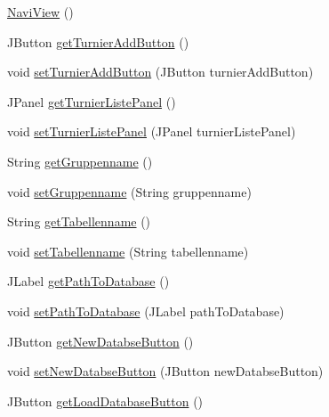 \begin{DoxyCompactItemize}
\item 
\hyperlink{classde_1_1turnierverwaltung_1_1view_1_1_navi_view_a902b43fc61b919187442721a3181e7db}{Navi\+View} ()
\item 
J\+Button \hyperlink{classde_1_1turnierverwaltung_1_1view_1_1_navi_view_abf008fc153ca383fc708f357a07c957f}{get\+Turnier\+Add\+Button} ()
\item 
void \hyperlink{classde_1_1turnierverwaltung_1_1view_1_1_navi_view_a4f66109881102f8f7e7462a22748b2dc}{set\+Turnier\+Add\+Button} (J\+Button turnier\+Add\+Button)
\item 
J\+Panel \hyperlink{classde_1_1turnierverwaltung_1_1view_1_1_navi_view_ab43468c56143bb27b23de9bd4a181d65}{get\+Turnier\+Liste\+Panel} ()
\item 
void \hyperlink{classde_1_1turnierverwaltung_1_1view_1_1_navi_view_abde5fadb23356880cd3871064dd0e0bd}{set\+Turnier\+Liste\+Panel} (J\+Panel turnier\+Liste\+Panel)
\item 
String \hyperlink{classde_1_1turnierverwaltung_1_1view_1_1_navi_view_a3099afb7425f03b2fa5626b797021e52}{get\+Gruppenname} ()
\item 
void \hyperlink{classde_1_1turnierverwaltung_1_1view_1_1_navi_view_a1de9bbbad0261bc5866bb77019b976a0}{set\+Gruppenname} (String gruppenname)
\item 
String \hyperlink{classde_1_1turnierverwaltung_1_1view_1_1_navi_view_a69a94b7e09d9956c76cb4480178d3c54}{get\+Tabellenname} ()
\item 
void \hyperlink{classde_1_1turnierverwaltung_1_1view_1_1_navi_view_aeee8397b8ec767f41829d710ace1948e}{set\+Tabellenname} (String tabellenname)
\item 
J\+Label \hyperlink{classde_1_1turnierverwaltung_1_1view_1_1_navi_view_a026e4dcf187cbf61e496e541ed1fae7b}{get\+Path\+To\+Database} ()
\item 
void \hyperlink{classde_1_1turnierverwaltung_1_1view_1_1_navi_view_a9ca0f7384d78651f19598af6a4ae08ff}{set\+Path\+To\+Database} (J\+Label path\+To\+Database)
\item 
J\+Button \hyperlink{classde_1_1turnierverwaltung_1_1view_1_1_navi_view_aba59c48897ed5a4d263d3a2c15cb3ac6}{get\+New\+Databse\+Button} ()
\item 
void \hyperlink{classde_1_1turnierverwaltung_1_1view_1_1_navi_view_a4abb8cfbbe938d2e2c5d9f386bc42458}{set\+New\+Databse\+Button} (J\+Button new\+Databse\+Button)
\item 
J\+Button \hyperlink{classde_1_1turnierverwaltung_1_1view_1_1_navi_view_af635efc0158ed566c25999bde7bc4d20}{get\+Load\+Database\+Button} ()

\end{DoxyCompactItemize}
